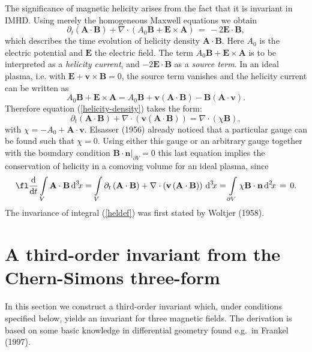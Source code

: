 \documentclass[10pt]{iopart}
\def \d{\mbox{d}}
\def \dxx{\,\d^{2}\!x}
\def \dxxx{\,\d^{3}\!x}
\def \Eq{equation }
\def \p{{\partial}}
\def \bA{{\mathbf{A}}}
\def \bB{{\mathbf{B}}}
\def \bE{{\mathbf{E}}}
\def \bv{{\mathbf{v}}}
\def \bn{{\mathbf{n}}}
\begin{document}
The significance of magnetic helicity arises from the fact that it is 
invariant in IMHD.
Using merely the homogeneous Maxwell equations we obtain
\begin{equation}
\p_t(\bA\cdot\bB)+\nabla\cdot\left(A_0\bB+\bE\times\bA\right) 
       \,=\, -2 \bE\cdot\bB,
\label{helicity-density} 
\end{equation}
which
describes the time evolution of helicity density $\bA\cdot\bB$.
Here $A_0$ is the electric potential and $\bE$ the electric field.
The term $A_0\bB+\bE\times\bA$ is to be interpreted as 
a {\em helicity current}, and
$-2\bE\cdot\bB$ as a {\em source term}.
In an ideal plasma, i.e. with $\bE + \bv\times\bB=0$, the source term
vanishes and the helicity current can be written as
\begin{equation}
   A_0\bB+\bE\times\bA = 
           A_0\bB+\bv\left(\bA\cdot\bB\right)-\bB\left(\bA\cdot\bv\right).
\end{equation}
Therefore \Eq (\ref{helicity-density}) takes the form:
\begin{equation}
   \p_t \left(\bA\cdot\bB\right)
       +\nabla\cdot\left(\bv\left(\bA\cdot\bB\right)\right) 
                        = \nabla\cdot\left(\chi\bB\right),
                        \label{helicity-conservation-equation}
\end{equation}
with $\chi=-A_0+\bA\cdot\bv$.
Elsasser (1956) already noticed that a 
particular gauge can be found such that $\chi=0$.
Using either this gauge or an arbitrary gauge together with the
boundary condition
$\bB\cdot\bn\big|_{\p V} = 0$
this last equation implies the conservation of helicity
in a comoving volume for an ideal plasma, since 
\begin{equation}
   \fl
   \frac{\d}{\d t}\int\limits_V \bA\cdot\bB \dxxx = 
   \int\limits_V \p_t \left(\bA\cdot\bB\right)
       +\nabla\cdot\left(\bv\left(\bA\cdot\bB\right)\right) \dxxx =
    \int\limits_{\p V} \chi\bB\cdot\bn \dxx \,= \,0.
    \label{helicity-conservation-proof}
\end{equation}
The invariance of integral (\ref{heldef}) was first stated by Woltjer (1958).
 



\section{A third-order invariant from the Chern-Simons three-form}
\label{section-third-order-invariant}
In this section we construct a third-order invariant
which, under conditions specified below, yields an invariant for three
magnetic fields. The derivation is based on some basic
knowledge in differential geometry found e.g.~in Frankel (1997). 
\end{document}
